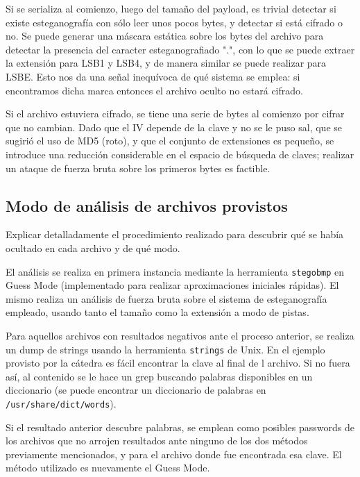 Si se serializa al comienzo, luego del tamaño del payload, es trivial detectar si existe esteganografía con sólo leer unos pocos bytes, y detectar si está cifrado o no. Se puede generar una máscara estática sobre los bytes del archivo para detectar la presencia del caracter esteganografiado ".", con lo que se puede extraer la extensión para LSB1 y LSB4, y de manera similar se puede realizar para LSBE. Esto nos da una señal inequívoca de qué sistema se emplea: si encontramos dicha marca entonces el archivo oculto no estará cifrado.

Si el archivo estuviera cifrado, se tiene una serie de bytes al comienzo por cifrar que no cambian. Dado que el IV depende de la clave y no se le puso sal, que se sugirió el uso de MD5 (roto), y que el conjunto de extensiones es pequeño, se introduce una reducción considerable en el espacio de búsqueda de claves; realizar un ataque de fuerza bruta sobre los primeros bytes es factible.

\subsection{Modo de análisis de archivos provistos}
\begin{displayquote}
Explicar detalladamente el procedimiento realizado para descubrir qué se había ocultado en
cada archivo y de qué modo.
\end{displayquote}

El análisis se realiza en primera instancia mediante la herramienta \texttt{stegobmp} en Guess Mode (implementado para realizar aproximaciones iniciales rápidas). El mismo realiza un análisis de fuerza bruta sobre el sistema de esteganografía empleado, usando tanto el tamaño como la extensión a modo de pistas.

Para aquellos archivos con resultados negativos ante el proceso anterior, se realiza un dump de  strings usando la herramienta \texttt{strings} de Unix. En el ejemplo provisto por la c\'atedra es f\'acil encontrar la clave al final de l archivo. Si no fuera as\'i, al contenido se le hace un grep buscando palabras disponibles en un diccionario (se puede encontrar un diccionario de palabras en \texttt{/usr/share/dict/words}).

Si el resultado anterior descubre palabras, se emplean como posibles passwords de los archivos que no arrojen resultados ante ninguno de los dos m\'etodos previamente mencionados, y para el archivo donde fue encontrada esa clave. El m\'etodo utilizado es nuevamente el Guess Mode.

